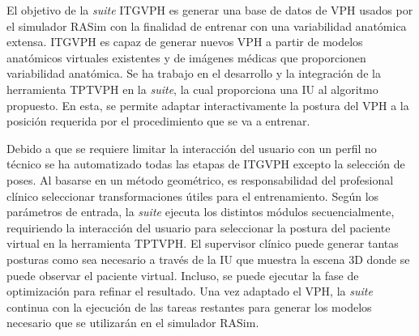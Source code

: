 
El objetivo de la \emph{suite} \ac{ITGVPH} es generar una base de datos de \ac{VPH} usados por el simulador \ac{RASim} con la finalidad de entrenar con una variabilidad anatómica extensa.
\ac{ITGVPH} es capaz de generar nuevos \ac{VPH} a partir de modelos anatómicos virtuales existentes y de imágenes médicas que proporcionen variabilidad anatómica.  
Se ha trabajo en el desarrollo y la integración de la herramienta \ac{TPTVPH} en la \emph{suite}, la cual proporciona una \ac{IU} al algoritmo propuesto. En esta, se permite adaptar interactivamente la postura del \ac{VPH} a la posición requerida por el procedimiento que se va a entrenar.
 


Debido a que se requiere limitar la interacción del usuario con un perfil no técnico se ha automatizado todas las etapas de \ac{ITGVPH} excepto la selección de poses. Al basarse en un método geométrico, es responsabilidad del profesional clínico seleccionar transformaciones útiles para el entrenamiento.   Según los parámetros de entrada, la \emph{suite} ejecuta los distintos módulos secuencialmente, requiriendo la interacción del usuario para seleccionar la postura del paciente virtual en la herramienta \ac{TPTVPH}. El supervisor clínico puede generar tantas posturas como sea necesario a través de la \ac{IU} que muestra la escena 3D donde se puede observar el paciente virtual. Incluso, se puede ejecutar la fase de optimización para refinar el resultado. Una vez adaptado el \ac{VPH}, la \emph{suite} continua con la ejecución de las tareas restantes para generar los modelos necesario que se utilizarán en el simulador \ac{RASim}.


